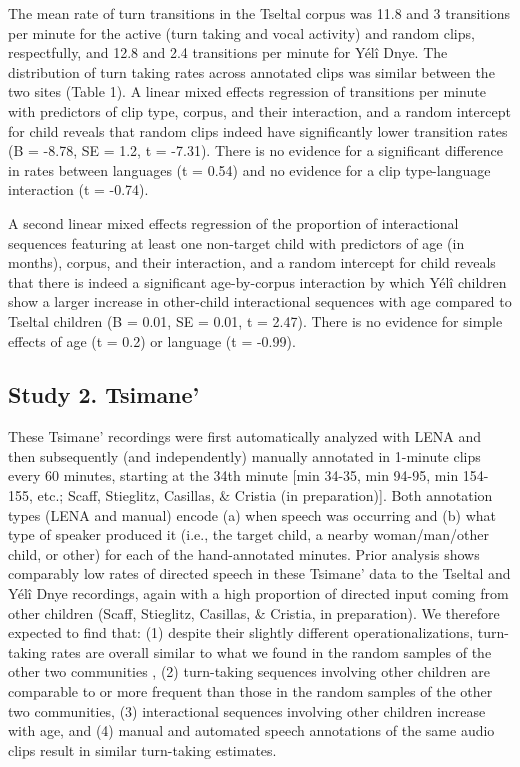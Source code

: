 \documentclass[10pt, letterpaper]{article}
\begin{document}
The mean rate of turn transitions in the Tseltal corpus was 11.8 and 3
transitions per minute for the active (turn taking and vocal activity)
and random clips, respectfully, and 12.8 and 2.4 transitions per minute
for Yélî Dnye. The distribution of turn taking rates across annotated
clips was similar between the two sites (Table 1). A linear mixed
effects regression of transitions per minute with predictors of clip
type, corpus, and their interaction, and a random intercept for child
reveals that random clips indeed have significantly lower transition
rates (B = -8.78, SE = 1.2, t = -7.31). There is no evidence for a
significant difference in rates between languages (t = 0.54) and no
evidence for a clip type-language interaction (t = -0.74).

A second linear mixed effects regression of the proportion of
interactional sequences featuring at least one non-target child with
predictors of age (in months), corpus, and their interaction, and a
random intercept for child reveals that there is indeed a significant
age-by-corpus interaction by which Yélî children show a larger increase
in other-child interactional sequences with age compared to Tseltal
children (B = 0.01, SE = 0.01, t = 2.47). There is no evidence for
simple effects of age (t = 0.2) or language (t = -0.99).

\hypertarget{study-2.-tsimane}{%
\subsection{Study 2. Tsimane'}\label{study-2.-tsimane}}

These Tsimane' recordings were first automatically analyzed with LENA
and then subsequently (and independently) manually annotated in 1-minute
clips every 60 minutes, starting at the 34th minute {[}min 34-35, min
94-95, min 154-155, etc.; Scaff, Stieglitz, Casillas, \& Cristia (in
preparation){]}. Both annotation types (LENA and manual) encode (a) when
speech was occurring and (b) what type of speaker produced it (i.e., the
target child, a nearby woman/man/other child, or other) for each of the
hand-annotated minutes. Prior analysis shows comparably low rates of
directed speech in these Tsimane' data to the Tseltal and Yélî Dnye
recordings, again with a high proportion of directed input coming from
other children (Scaff, Stieglitz, Casillas, \& Cristia, in preparation).
We therefore expected to find that: (1) despite their slightly different
operationalizations, turn-taking rates are overall similar to what we
found in the random samples of the other two communities , (2)
turn-taking sequences involving other children are comparable to or more
frequent than those in the random samples of the other two communities,
(3) interactional sequences involving other children increase with age,
and (4) manual and automated speech annotations of the same audio clips
result in similar turn-taking estimates.
\end{document}

